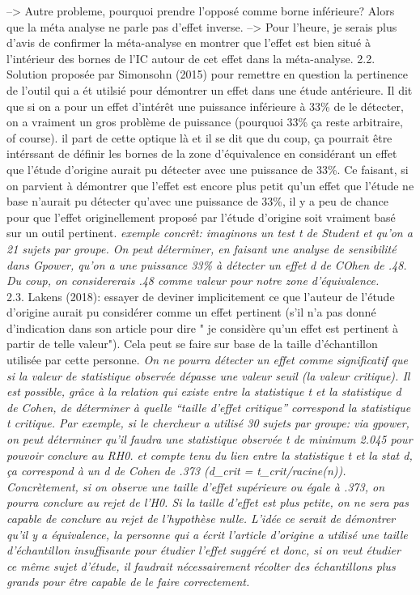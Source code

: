 \documentclass[
  english,
  man]{apa6}
\begin{document}
--\textgreater{} Autre probleme, pourquoi prendre l'opposé comme borne inférieure? Alors que la méta analyse ne parle pas d'effet inverse.
--\textgreater{} Pour l'heure, je serais plus d'avis de confirmer la méta-analyse en montrer que l'effet est bien situé à l'intérieur des bornes de l'IC autour de cet effet dans la méta-analyse.
2.2. Solution proposée par Simonsohn (2015) pour remettre en question la pertinence de l'outil qui a ét utilsié pour démontrer un effet dans une étude antérieure. Il dit que si on a pour un effet d'intérêt une puissance inférieure à 33\% de le détecter, on a vraiment un gros problème de puissance (pourquoi 33\% ça reste arbitraire, of course). il part de cette optique là et il se dit que du coup, ça pourrait être intérssant de définir les bornes de la zone d'équivalence en considérant un effet que l'étude d'origine aurait pu détecter avec une puissance de 33\%. Ce faisant, si on parvient à démontrer que l'effet est encore plus petit qu'un effet que l'étude ne base n'aurait pu détecter qu'avec une puissance de 33\%, il y a peu de chance pour que l'effet originellement proposé par l'étude d'origine soit vraiment basé sur un outil pertinent. \emph{exemple concrêt: imaginons un test t de Student et qu'on a 21 sujets par groupe. On peut déterminer, en faisant une analyse de sensibilité dans Gpower, qu'on a une puissance 33\% à détecter un effet d de COhen de .48. Du coup, on considererais .48 comme valeur pour notre zone d'équivalence.}\\
2.3. Lakens (2018): essayer de deviner implicitement ce que l'auteur de l'étude d'origine aurait pu considérer comme un effet pertinent (s'il n'a pas donné d'indication dans son article pour dire " je considère qu'un effet est pertinent à partir de telle valeur"). Cela peut se faire sur base de la taille d'échantillon utilisée par cette personne. \emph{On ne pourra détecter un effet comme significatif que si la valeur de statistique observée dépasse une valeur seuil (la valeur critique). Il est possible, grâce à la relation qui existe entre la statistique t et la statistique d de Cohen, de déterminer à quelle ``taille d'effet critique'' correspond la statistique t critique. Par exemple, si le chercheur a utilisé 30 sujets par groupe: via gpower, on peut déterminer qu'il faudra une statistique observée t de minimum 2.045 pour pouvoir conclure au RH0. et compte tenu du lien entre la statistique t et la stat d, ça correspond à un d de Cohen de .373 (d\_crit = t\_crit/racine(n)). Concrètement, si on observe une taille d'effet supérieure ou égale à .373, on pourra conclure au rejet de l'H0. Si la taille d'effet est plus petite, on ne sera pas capable de conclure au rejet de l'hypothèse nulle. L'idée ce serait de démontrer qu'il y a équivalence, la personne qui a écrit l'article d'origine a utilisé une taille d'échantillon insuffisante pour étudier l'effet suggéré et donc, si on veut étudier ce même sujet d'étude, il faudrait nécessairement récolter des échantillons plus grands pour être capable de le faire correctement. }
\end{document}
